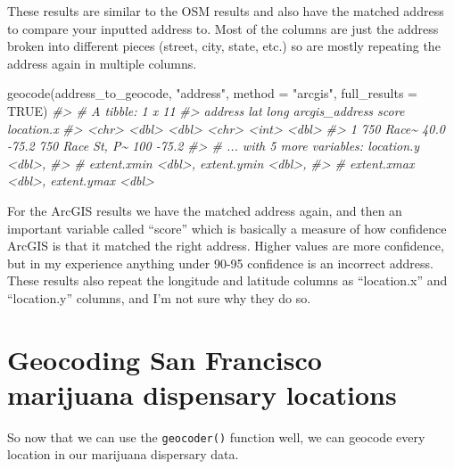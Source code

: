 \documentclass[
]{krantz}
\makeatletter
\newenvironment{Shaded}{\begin{snugshade}}{\end{snugshade}}
\newcommand{\AttributeTok}[1]{\textcolor[rgb]{0.61,0.61,0.61}{#1}}
\newcommand{\CommentTok}[1]{\textcolor[rgb]{0.37,0.37,0.37}{\textit{#1}}}
\newcommand{\ConstantTok}[1]{\textcolor[rgb]{0,0,0}{#1}}
\newcommand{\FunctionTok}[1]{\textcolor[rgb]{0,0,0}{#1}}
\newcommand{\NormalTok}[1]{#1}
\newcommand{\StringTok}[1]{\textcolor[rgb]{0.5,0.5,0.5}{#1}}
\newenvironment{kframe}{%
\medskip{}
\setlength{\fboxsep}{.8em}
 \def\at@end@of@kframe{}%
 \ifinner\ifhmode%
  \def\at@end@of@kframe{\end{minipage}}%
  \begin{minipage}{\columnwidth}%
 \fi\fi%
 \def\FrameCommand##1{\hskip\@totalleftmargin \hskip-\fboxsep
 \colorbox{shadecolor}{##1}\hskip-\fboxsep
     \hskip-\linewidth \hskip-\@totalleftmargin \hskip\columnwidth}%
 \MakeFramed {\advance\hsize-\width
   \@totalleftmargin\z@ \linewidth\hsize
   \@setminipage}}%
 {\par\unskip\endMakeFramed%
 \at@end@of@kframe}
\renewenvironment{Shaded}{\begin{kframe}}{\end{kframe}}
\makeatother
\begin{document}
These results are similar to the OSM results and also have the matched address to compare your inputted address to. Most of the columns are just the address broken into different pieces (street, city, state, etc.) so are mostly repeating the address again in multiple columns.

\begin{Shaded}
\begin{Highlighting}[]
\FunctionTok{geocode}\NormalTok{(address\_to\_geocode, }\StringTok{"address"}\NormalTok{, }\AttributeTok{method =} \StringTok{"arcgis"}\NormalTok{,}
  \AttributeTok{full\_results =} \ConstantTok{TRUE}\NormalTok{)}
\CommentTok{\#\textgreater{} \# A tibble: 1 x 11}
\CommentTok{\#\textgreater{}   address     lat  long arcgis\_address  score location.x}
\CommentTok{\#\textgreater{}   \textless{}chr\textgreater{}     \textless{}dbl\textgreater{} \textless{}dbl\textgreater{} \textless{}chr\textgreater{}           \textless{}int\textgreater{}      \textless{}dbl\textgreater{}}
\CommentTok{\#\textgreater{} 1 750 Race\textasciitilde{}  40.0 {-}75.2 750 Race St, P\textasciitilde{}   100      {-}75.2}
\CommentTok{\#\textgreater{} \# ... with 5 more variables: location.y \textless{}dbl\textgreater{},}
\CommentTok{\#\textgreater{} \#   extent.xmin \textless{}dbl\textgreater{}, extent.ymin \textless{}dbl\textgreater{},}
\CommentTok{\#\textgreater{} \#   extent.xmax \textless{}dbl\textgreater{}, extent.ymax \textless{}dbl\textgreater{}}
\end{Highlighting}
\end{Shaded}

For the ArcGIS results we have the matched address again, and then an important variable called ``score'' which is basically a measure of how confidence ArcGIS is that it matched the right address. Higher values are more confidence, but in my experience anything under 90-95 confidence is an incorrect address. These results also repeat the longitude and latitude columns as ``location.x'' and ``location.y'' columns, and I'm not sure why they do so.

\hypertarget{geocoding-san-francisco-marijuana-dispensary-locations}{%
\section{Geocoding San Francisco marijuana dispensary locations}\label{geocoding-san-francisco-marijuana-dispensary-locations}}

So now that we can use the \texttt{geocoder()} function well, we can geocode every location in our marijuana dispersary data.
\end{document}
